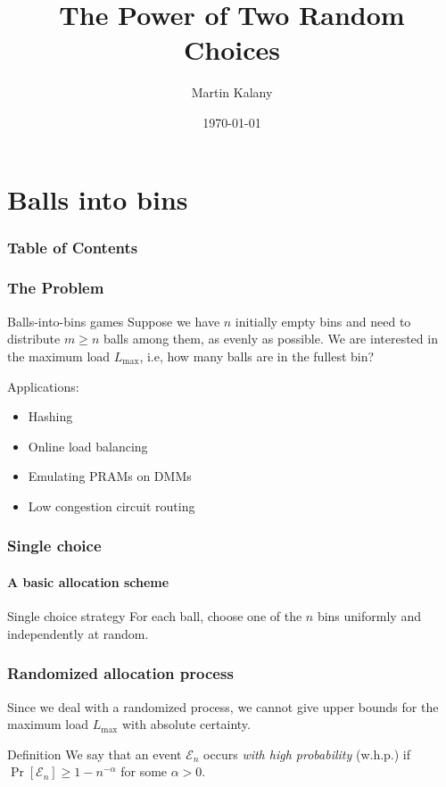 \documentclass{beamer}
\title{The Power of Two Random Choices}
\author{Martin Kalany}
\institute
{
  Graduate student in Computer Science\\
  Vienna University of Technology\\
}
\date{\today}
\newcommand\load{L_{\mathrm{max}}}
\newcommand\scalefac{0.55}
\newcommand\ballsize{5mm}
\newcommand\nrbins{6}
\newcommand\padding{0.1*\ballsize}
\newcommand\bingap{1.6*\balldiameter}
\newcommand\balldiameter{2*\ballsize}
\newcommand\bin[1]{
	\path node[topflat, xshift=#1*\bingap*\scalefac, above, yshift=-\padding*\scalefac]  {};
}
\newcommand\bins{
	\foreach \ibin in {1,...,\nrbins}
		\bin{\ibin};
}
\newcommand\ball[2]{
	\shade[ballstyle] (#1*\bingap,#2*\balldiameter-\ballsize) circle (\ballsize)
}
\newcommand\putinbin[2]{
	\ifnum #2 > 0
		\foreach \nrballs in {1,...,#2}
 			\ball{#1}{\nrballs};
 	\fi
}
\newcounter{index}
\newcommand\balls[1]{%
	\getargsC{#1}%
  	\setcounter{index}{0}%
  	\whiledo{\theindex < \narg}{%
    		\stepcounter{index}%
    		\putinbin{\theindex}{\csname arg\romannumeral\theindex\endcsname}%
  	}%
}
\newcommand\bab[1]{%
	\bins
	\balls{#1}
}
\begin{document}
\frame{\titlepage}

\section{Balls into bins}
\begin{frame}
    \frametitle{Table of Contents}
    \tableofcontents
\end{frame}

\begin{frame}
\frametitle{The Problem}
\begin{block}{Balls-into-bins games}
Suppose we have $n$ initially empty bins and need to distribute $m \geq n$ balls among them, as evenly as possible. We are interested in the maximum load $\load$, i.e, how many balls are in the fullest bin?
\end{block}
\pause
Applications:
\begin{itemize}
	\item Hashing
	\item Online load balancing
	\item Emulating PRAMs on DMMs
	\item Low congestion circuit routing
\end{itemize}
\end{frame}

\begin{frame}
\frametitle{Single choice}
\framesubtitle{A basic allocation scheme}
\begin{block}{Single choice strategy}
For each ball, choose one of the $n$ bins uniformly and independently at random.
\end{block}
\bigskip
\begin{center}
\end{center}
\end{frame}

\begin{frame}
\frametitle{Randomized allocation process}

Since we deal with a randomized process, we cannot give upper bounds for the maximum load $\load$ with absolute certainty. 

\bigskip

\begin{block}{Definition}
We say that an event $\mathcal E_n$ occurs \emph{with high probability} (w.h.p.) if $\Pr\left[\mathcal E_n \right] \geq 1 - n^{-\alpha}$ for some $\alpha > 0$.
\end{block}
\end{frame}
\end{document}
